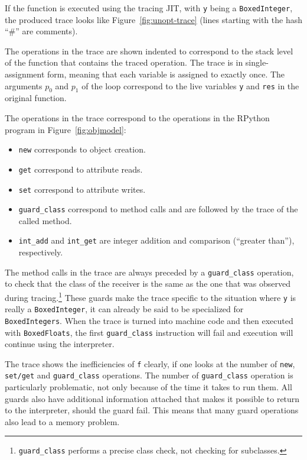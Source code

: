 \documentclass[preprint]{sigplanconf}
\begin{document}
If the function is executed using the tracing JIT, with \lstinline{y} being a
\lstinline{BoxedInteger}, the produced trace looks like
Figure~\ref{fig:unopt-trace} (lines starting with the hash ``\#'' are comments).

The operations in the trace are shown indented to
correspond to the stack level of the function that contains the traced
operation. The trace is in single-assignment form, meaning that each variable is
assigned to exactly once. The arguments $p_0$ and $p_1$ of the loop correspond
to the live variables \lstinline{y} and \lstinline{res} in the original function.

The operations in the trace correspond to the operations in the RPython program
in Figure~\ref{fig:objmodel}:

\begin{itemize}
    \item \lstinline{new} corresponds to object creation.
    \item \lstinline{get} correspond to attribute reads.
    \item \lstinline{set} correspond to attribute writes.
    \item \lstinline{guard_class} correspond to method calls and are followed by
    the trace of the called method.
    \item \lstinline{int_add} and \lstinline{int_get} are integer addition and
    comparison (``greater than''), respectively.
\end{itemize}

The method calls in the trace are always preceded by a \lstinline{guard_class}
operation, to check that the class of the receiver is the same as the one that
was observed during tracing.\footnote{\lstinline{guard_class} performs a precise
class check, not checking for subclasses.} These guards make the trace specific
to the situation where \lstinline{y} is really a \lstinline{BoxedInteger}, it can
already be said to be specialized for \lstinline{BoxedIntegers}. When the trace is
turned into machine code and then executed with \lstinline{BoxedFloats}, the
first \lstinline{guard_class} instruction will fail and execution will continue
using the interpreter.

The trace shows the inefficiencies of \lstinline{f} clearly, if one looks at
the number of \lstinline{new}, \lstinline{set/get} and \lstinline{guard_class}
operations. The number of \lstinline{guard_class} operation is particularly
problematic, not only because of the time it takes to run them. All guards also
have additional information attached that makes it possible to return to the
interpreter, should the guard fail. This means that many guard operations also
lead to a memory problem.
\end{document}

